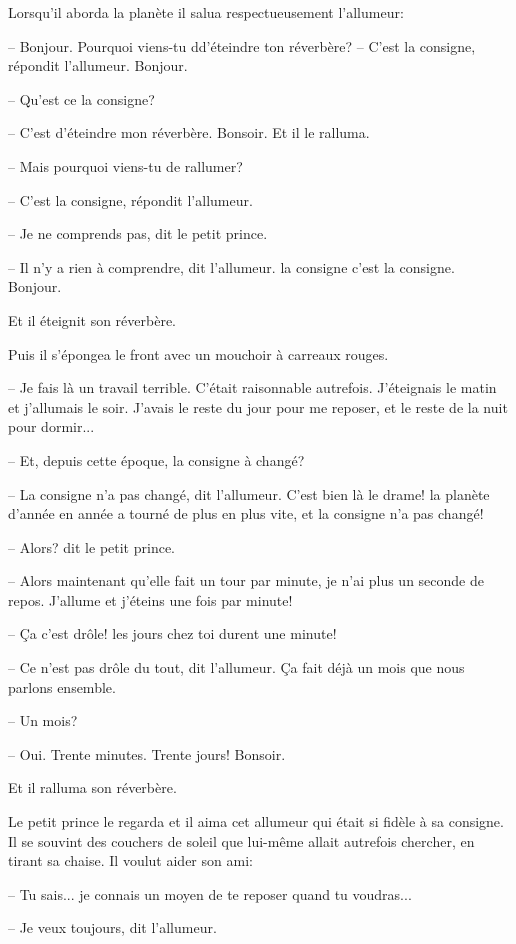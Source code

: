 \documentclass[a4paper]{report}
\begin{document}
Lorsqu'il aborda la planète il salua respectueusement l'allumeur:

-- Bonjour. Pourquoi viens-tu dd'éteindre ton réverbère?
-- C'est la consigne, répondit l'allumeur. Bonjour.

-- Qu'est ce la consigne?

-- C'est d'éteindre mon réverbère. Bonsoir.
Et il le ralluma.

-- Mais pourquoi viens-tu de rallumer?

-- C'est la consigne, répondit l'allumeur.

-- Je ne comprends pas, dit le petit prince.

-- Il n'y a rien à comprendre, dit l'allumeur. la consigne c'est la consigne. Bonjour.

Et il éteignit son réverbère.

Puis il s'épongea le front avec un mouchoir à carreaux rouges.

-- Je fais là un travail terrible. C'était raisonnable autrefois. J'éteignais le matin et j'allumais le soir. J'avais le reste du jour pour me reposer, et le reste de la nuit pour dormir...

-- Et, depuis cette époque, la consigne à changé?

-- La consigne n'a pas changé, dit l'allumeur. C'est bien là le drame! la planète d'année en année a tourné de plus en plus vite, et la consigne n'a pas changé!

-- Alors? dit le petit prince.

-- Alors maintenant qu'elle fait un tour par minute, je n'ai plus un seconde de repos. J'allume et j'éteins une fois par minute!

-- Ça c'est drôle! les jours chez toi durent une minute!

-- Ce n'est pas drôle du tout, dit l'allumeur. Ça fait déjà un mois que nous parlons ensemble.

-- Un mois?

-- Oui. Trente minutes. Trente jours! Bonsoir.

Et il ralluma son réverbère.

Le petit prince le regarda et il aima cet allumeur qui était si fidèle à sa consigne. Il se souvint des couchers de soleil que lui-même allait autrefois chercher, en tirant sa chaise. Il voulut aider son ami:

-- Tu sais... je connais un moyen de te reposer quand tu voudras...

-- Je veux toujours, dit l'allumeur.
\end{document}
